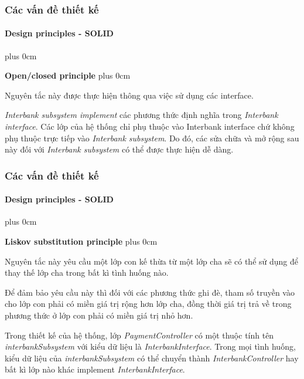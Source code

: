 \documentclass[11pt]{beamer}
\renewcommand{\raggedright}{\leftskip=0pt \rightskip=0pt plus 0cm}
\let\olditemize=\itemize
\renewenvironment{itemize}{\olditemize\raggedright}{\endlist}
\begin{document}
\begin{frame}[plain]
	\frametitle{Các vấn đề thiết kế}
	\framesubtitle{Design principles - SOLID}
	\begin{itemize}
		\item \textbf{Open/closed principle}
		\begin{itemize}
			\item Nguyên tắc này được thực hiện thông qua việc sử dụng các interface.
			\item \textit{Interbank subsystem implement} các phương thức định nghĩa trong \textit{Interbank interface}. Các lớp của hệ thống chỉ phụ thuộc vào Interbank interface chứ không phụ thuộc trực tiếp vào \textit{Interbank subsystem}. Do đó, các sửa chữa và mở rộng sau này đối với \textit{Interbank subsystem} có thể được thực hiện dễ dàng.
		\end{itemize}
	\end{itemize}
\end{frame}
\begin{frame}[plain]
	\frametitle{Các vấn đề thiết kế}
	\framesubtitle{Design principles - SOLID}
	\begin{itemize}
		\item \textbf{Liskov substitution principle}
		\begin{itemize}
			\item Nguyên tắc này yêu cầu một lớp con kế thừa từ một lớp cha sẽ có thể sử dụng để thay thế
lớp cha trong bất kì tình huống nào.\\[5pt]
			\item Để đảm bảo yêu cầu này thì đối với các phương thức ghi đè, tham số truyền vào cho lớp con phải có miền giá trị rộng hơn lớp cha, đồng thời giá trị trả về trong phương thức ở lớp con phải có miền giá trị nhỏ hơn.\\[5pt]
			\item Trong thiết kế của hệ thống, lớp \textit{PaymentController} có một thuộc tính tên \textit{interbankSubsystem} với kiểu dữ liệu là \textit{InterbankInterface}. Trong mọi tình huống, kiểu dữ liệu của \textit{interbankSubsystem} có thể chuyển thành \textit{InterbankController}  hay bất kì lớp nào khác implement \textit{InterbankInterface}.
		\end{itemize}
	\end{itemize}
\end{frame}
\end{document}
